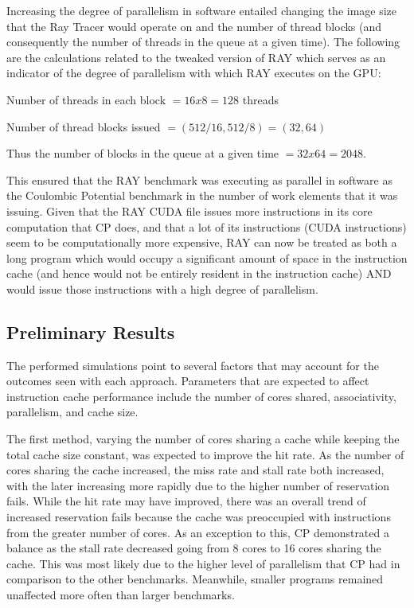 Increasing the degree of parallelism in software entailed changing the
image size that the Ray Tracer would operate on and the number of
thread blocks (and consequently the number of threads in the queue at
a given time). 
The following are the calculations related to the tweaked version of RAY which serves as an indicator of the degree of parallelism with which RAY executes on the GPU:

Number of threads in each block $= 16 x 8 = 128$ threads

Number of thread blocks issued $= (512/16, 512/8) = (32, 64)$

Thus the number of blocks in the queue at a given time $= 32 x 64 = 2048.$

This ensured that the RAY benchmark was executing as parallel in
software as the Coulombic Potential benchmark in the number of work
elements that it was issuing. 
Given that the RAY CUDA file issues more instructions in its core
computation that CP does, and that a lot of its instructions (CUDA
instructions) seem to be computationally more expensive, RAY can now
be treated as both a long program which would occupy a significant
amount of space in the instruction cache (and hence would not be
entirely resident in the instruction cache) AND would issue those
instructions with a high degree of parallelism.

\subsection{Preliminary Results}

The performed simulations point to several factors that may account 
for the outcomes seen with each approach. Parameters that are expected 
to affect instruction cache performance include the number of cores 
shared, associativity, parallelism, and cache size.

The first method, varying the number of cores sharing a cache while 
keeping the total cache size constant, was expected to improve the hit 
rate. As the number of cores sharing the cache increased, the miss rate 
and stall rate both increased, with the later increasing more rapidly 
due to the higher number of reservation fails. While the hit rate may 
have improved, there was an overall trend of increased reservation fails 
because the cache was preoccupied with instructions from the greater 
number of cores. As an exception to this, CP demonstrated a balance as 
the stall rate decreased going from 8 cores to 16 cores sharing the 
cache. This was most likely due to the higher level of parallelism that 
CP had in comparison to the other benchmarks. Meanwhile, smaller programs 
remained unaffected more often than larger benchmarks.

